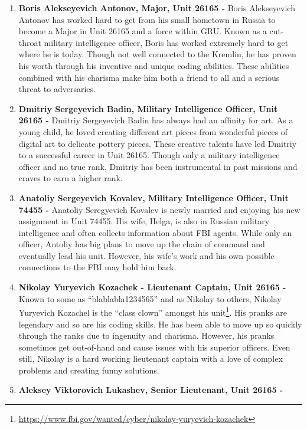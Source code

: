 \documentclass[10pt, letterpaper]{article}
\begin{document}
\begin{enumerate}
\item
  \textbf{Boris Alekseyevich Antonov, Major, Unit 26165 -} Boris
  Alekseyevich Antonov has worked hard to get from his small hometown in
  Russia to become a Major in Unit 26165 and a force within GRU. Known
  as a cut-throat military intelligence officer, Boris has worked
  extremely hard to get where he is today. Though not well connected to
  the Kremlin, he has proven his worth through his inventive and unique
  coding abilities. These abilities combined with his charisma make him
  both a friend to all and a serious threat to adversaries.
\item
  \textbf{Dmitriy Sergeyevich Badin, Military Intelligence Officer, Unit
  26165 -} Dmitriy Sergeyevich Badin has always had an affinity for art.
  As a young child, he loved creating different art pieces from
  wonderful pieces of digital art to delicate pottery pieces. These
  creative talents have led Dmitriy to a successful career in Unit
  26165. Though only a military intelligence officer and no true rank,
  Dmitriy has been instrumental in past missions and craves to earn a
  higher rank.
\item
  \textbf{Anatoliy Sergeyevich Kovalev, Military Intelligence Officer,
  Unit 74455 -} Anatoliy Seregyevich Kovalev is newly married and
  enjoying his new assignment in Unit 74455. His wife, Helga, is also in
  Russian military intelligence and often collects information about FBI
  agents. While only an officer, Antoliy has big plans to move up the
  chain of command and eventually lead his unit. However, his wife's
  work and his own possible connections to the FBI may hold him back.
\item
  \textbf{Nikolay Yuryevich Kozachek - Lieutenant Captain, Unit 26165 -}
  Known to some as ``blablabla1234565'' and as Nikolay to others,
  Nikolay Yuryevich Kozachel is the ``class clown'' amongst his
  unit\footnote{\href{https://www.fbi.gov/wanted/cyber/nikolay-yuryevich-kozachek}{\underline{https://www.fbi.gov/wanted/cyber/nikolay-yuryevich-kozachek}}}.
  His pranks are legendary and so are his coding skills. He has been
  able to move up so quickly through the ranks due to ingenuity and
  charisma. However, his pranks sometimes get out-of-hand and cause
  issues with his superior officers. Even still, Nikolay is a hard
  working lieutenant captain with a love of complex problems and
  creating funny solutions.
\item
  \textbf{Aleksey Viktorovich Lukashev, Senior Lieutenant, Unit 26165 -}

\end{enumerate}
\end{document}
